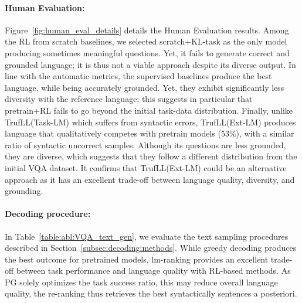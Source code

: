 \documentclass{article}
\newcommand{\algo}{TrufLL\xspace}
\begin{document}
\paragraph{Human Evaluation:}
Figure~\ref{fig:human_eval_details} details the Human Evaluation results. 
Among the RL from scratch baselines, we selected scratch+KL-task as the only model producing sometimes meaningful questions. Yet, it fails to generate correct and grounded language; it is thus not a viable approach despite its diverse output. In line with the automatic metrics, the supervised baselines produce the best language, while being accurately grounded. Yet, they exhibit significantly less diversity with the reference language; this suggests in particular that pretrain+RL fails to go beyond the initial task-data distribution. Finally, unlike \algo(Task-LM) which suffers from syntactic errors, \algo(Ext-LM) produces language that qualitatively competes with pretrain models (53\%), with a similar ratio of syntactic uncorrect samples. Although its questions are less grounded, they are diverse, which suggests that they follow a different distribution from the initial VQA dataset. It confirms that \algo(Ext-LM) could be an alternative approach as it has an excellent trade-off between language quality, diversity, and grounding.



\paragraph{Decoding procedure:}
In Table~\ref{table:abl:VQA_text_gen}, we evaluate the text sampling procedures described in Section~\ref{subsec:decoding:methods}. While greedy decoding produces the best outcome for pretrained models, lm-ranking provides an excellent trade-off between task performance and language quality with RL-based methods. As PG solely optimizes the task success ratio, this may reduce overall language quality, 
the re-ranking thus retrieves the best syntactically sentences a posteriori. 
\end{document}
